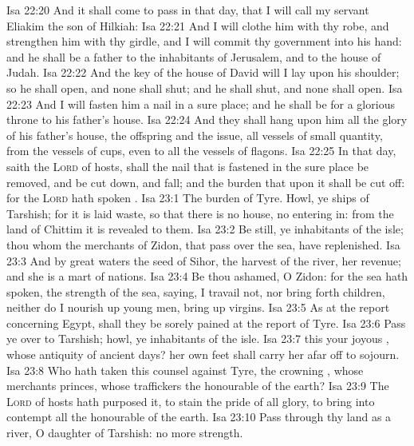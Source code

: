 \vs Isa 22:20 And it shall come to pass in that day, that I will call my servant Eliakim the son of Hilkiah:
\vs Isa 22:21 And I will clothe him with thy robe, and strengthen him with thy girdle, and I will commit thy government into his hand: and he shall be a father to the inhabitants of Jerusalem, and to the house of Judah.
\vs Isa 22:22 And the key of the house of David will I lay upon his shoulder; so he shall open, and none shall shut; and he shall shut, and none shall open.
\vs Isa 22:23 And I will fasten him  a nail in a sure place; and he shall be for a glorious throne to his father's house.
\vs Isa 22:24 And they shall hang upon him all the glory of his father's house, the offspring and the issue, all vessels of small quantity, from the vessels of cups, even to all the vessels of flagons.
\vs Isa 22:25 In that day, saith the \textsc{Lord} of hosts, shall the nail that is fastened in the sure place be removed, and be cut down, and fall; and the burden that  upon it shall be cut off: for the \textsc{Lord} hath spoken .
\vs Isa 23:1 The burden of Tyre. Howl, ye ships of Tarshish; for it is laid waste, so that there is no house, no entering in: from the land of Chittim it is revealed to them.
\vs Isa 23:2 Be still, ye inhabitants of the isle; thou whom the merchants of Zidon, that pass over the sea, have replenished.
\vs Isa 23:3 And by great waters the seed of Sihor, the harvest of the river,  her revenue; and she is a mart of nations.
\vs Isa 23:4 Be thou ashamed, O Zidon: for the sea hath spoken,  the strength of the sea, saying, I travail not, nor bring forth children, neither do I nourish up young men,  bring up virgins.
\vs Isa 23:5 As at the report concerning Egypt,  shall they be sorely pained at the report of Tyre.
\vs Isa 23:6 Pass ye over to Tarshish; howl, ye inhabitants of the isle.
\vs Isa 23:7  this your joyous , whose antiquity  of ancient days? her own feet shall carry her afar off to sojourn.
\vs Isa 23:8 Who hath taken this counsel against Tyre, the crowning , whose merchants  princes, whose traffickers  the honourable of the earth?
\vs Isa 23:9 The \textsc{Lord} of hosts hath purposed it, to stain the pride of all glory,  to bring into contempt all the honourable of the earth.
\vs Isa 23:10 Pass through thy land as a river, O daughter of Tarshish:  no more strength.
